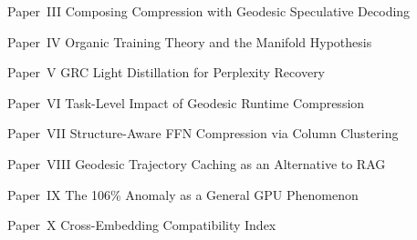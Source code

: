 \documentclass[11pt]{article}
\begin{document}
\noindent Paper~III \hfill Composing Compression with Geodesic Speculative Decoding

\noindent Paper~IV \hfill Organic Training Theory and the Manifold Hypothesis

\noindent Paper~V \hfill GRC Light Distillation for Perplexity Recovery

\noindent Paper~VI \hfill Task-Level Impact of Geodesic Runtime Compression

\noindent Paper~VII \hfill Structure-Aware FFN Compression via Column Clustering

\noindent Paper~VIII \hfill Geodesic Trajectory Caching as an Alternative to RAG

\noindent Paper~IX \hfill The 106\% Anomaly as a General GPU Phenomenon

\noindent Paper~X \hfill Cross-Embedding Compatibility Index

\vspace{12pt}

\clearpage
\tableofcontents
\clearpage

\clearpage












\end{document}
